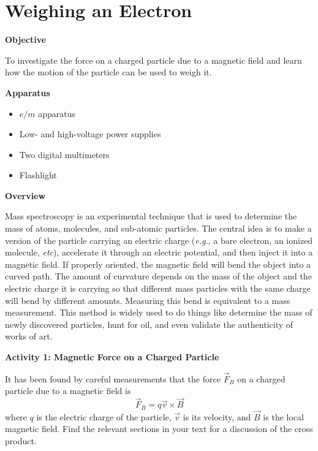 \setcounter{equation}{0}
\setcounter{figure}{0}

\section{Weighing an Electron}

\makelabheader %

\bigskip
\textbf{Objective}

To investigate the force on a charged particle due to a magnetic field and 
learn how the motion of the particle can be used to weigh it.

\bigskip
\textbf{Apparatus}

\begin{itemize}[nosep]

\item $e/m$ apparatus

\item Low- and high-voltage power supplies

\item Two digital multimeters

\item Flashlight

\end{itemize}

\medskip
\textbf{Overview}

Mass spectroscopy is an experimental technique that is used to determine
the mass of atoms, molecules, and sub-atomic particles.
The central idea is to make a version of the particle carrying an electric
charge ({\it e.g.}, a bare electron, an ionized molecule, {\it etc}), accelerate it
through an electric potential, and then inject it into a magnetic field.
If properly oriented, the magnetic field will bend the object into
a curved path.
The amount of curvature depends on the mass of the object and the electric
charge it is carrying so that different mass particles with the same charge will
bend by different amounts.
Measuring this bend is equivalent to a mass measurement.
This method is widely used to do things like determine the mass of newly discovered particles,
hunt for oil, and even validate the authenticity of works of art.

\bigskip
\textbf{Activity 1: Magnetic Force on a Charged Particle}

It has been found by careful measurements that the force $\vec F_B$ on a charged
particle due to a magnetic field is
\begin{equation}
\vec F_B = q \vec v \times \vec B
\end{equation}
where $q$ is the electric charge of the particle, $\vec v$ is its velocity,
and $\vec B$ is the local magnetic field.
Find the relevant sections in your text for a discussion of the cross product.

